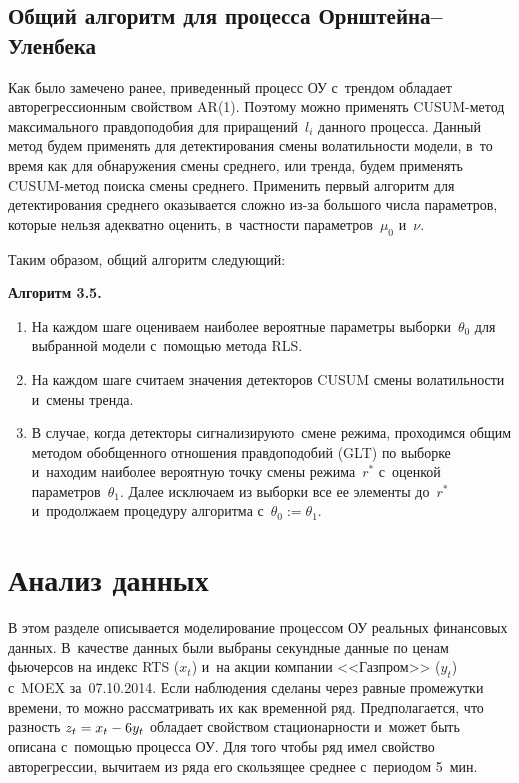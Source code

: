 \begin{multicols}{2}
\subsection{Общий алгоритм для процесса Орнштейна--Уленбека}

Как было замечено ранее, приведенный процесс ОУ с~трендом обладает 
авторегрессионным свойством AR(1). Поэтому можно применять CUSUM-ме\-тод 
максимального правдоподобия для приращений~$l_i$ данного процесса. Данный метод 
будем\linebreak
 применять для детектирования смены во\-ла\-тиль\-ности модели, в~то время как 
для обнаружения смены среднего, или тренда, будем применять CUSUM-ме\-тод поиска 
смены среднего. Применить первый алгоритм для детектирования среднего 
оказывается сложно из-за большого числа параметров, которые нельзя адекватно 
оценить, в~частности па\-ра\-мет\-ров~$\mu_0$ и~$\nu$.

Таким образом, общий алгоритм следующий:

\smallskip

\noindent
\textbf{Алгоритм 3.5.} %

\noindent
\begin{enumerate}[1.]
\item На каждом шаге оцениваем наиболее вероятные параметры выборки~$\theta_0$ 
для выбранной модели с~помощью метода RLS.
\item На каждом шаге считаем значения детекторов CUSUM смены волатильности 
и~смены тренда.
\item В случае, когда детекторы сигнализируют\linebreak о~смене режима, проходимся общим 
методом обобщенного отношения правдоподобий (GLT) по выборке и~находим наиболее 
вероятную точку смены режима~$r^*$ с~оценкой параметров~$\theta_1$. Далее 
исключаем из выборки все ее элементы до~$r^*$ и~продолжаем процедуру алгоритма 
с~$\theta_0:=\theta_1$.
\end{enumerate}


\section{Анализ данных}

       В этом разделе описывается моделирование процессом ОУ 
реальных финансовых данных. В~качестве данных были выбраны секундные данные по 
ценам фьючерсов на индекс RTS ($x_t$) и~на акции компании <<Газпром>> ($y_t$) 
с~MOEX за~07.10.2014. Если наблюдения сделаны через равные промежутки времени, то 
можно рассматривать их как временной ряд.
Предполагается, что разность $z_t \hm= x_t \hm - 6  y_t$ обладает свойством 
стационарности и~может быть описана с~помощью процесса ОУ. Для 
того чтобы ряд имел свойство авторегрессии, вычитаем из ряда его скользящее 
среднее с~периодом 5~мин.


\end{multicols}
